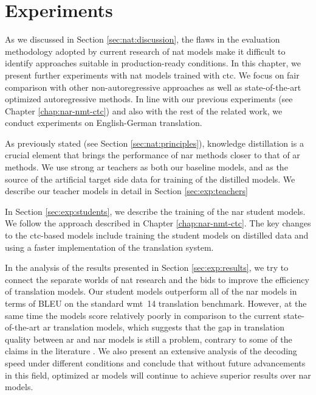 \chapter{Experiments}%
\label{chap:experiments}


As we discussed in Section \ref{sec:nat:discussion}, the flaws in the
evaluation methodology adopted by current research of \ac{nat} models make it
difficult to identify approaches suitable in production-ready conditions.  In
this chapter, we present further experiments with \ac{nat} models trained with
\ac{ctc}. We focus on fair comparison with other non-autoregressive approaches
as well as state-of-the-art optimized autoregressive methods.  In line with our
previous experiments (see Chapter \ref{chap:nar-nmt-ctc}) and also with the
rest of the related work, we conduct experiments on English-German translation.

As previously stated (see Section \ref{sec:nat:principles}), knowledge
distillation \citep{kim-rush-2016-sequence} is a crucial element that brings
the performance of \ac{nar} methods closer to that of \ac{ar} methods. We use
strong \ac{ar} teachers as both our baseline models, and as the source of the
artificial target side data for training of the distilled models. We describe
our teacher models in detail in Section \ref{sec:exp:teachers}

In Section \ref{sec:exp:students}, we describe the training of the \ac{nar}
student models. We follow the approach described in Chapter
\ref{chap:nar-nmt-ctc}. The key changes to the \acs{ctc}-based models include
training the student models on distilled data and using a faster implementation
of the translation system.

In the analysis of the results presented in Section \ref{sec:exp:results}, we
try to connect the separate worlds of \ac{nat} research and the bids to improve
the efficiency of translation models. Our student models outperform all of the
\ac{nar} models in terms of BLEU on the standard \acs{wmt}~14 translation
benchmark. However, at the same time the models score relatively poorly in
comparison to the current state-of-the-art \ac{ar} translation models, which
suggests that the gap in translation quality between \ac{ar} and \ac{nar}
models is still a problem, contrary to some of the claims in the literature
\citep{gu-kong-2021-fully,saharia-etal-2020-non}. We also present an extensive
analysis of the decoding speed under different conditions and conclude that
without future advancements in this field, optimized \ac{ar} models will
continue to achieve superior results over \ac{nar} models.


